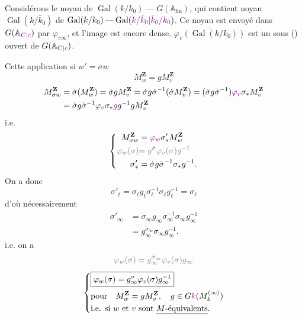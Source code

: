 Considérons le noyau de $\operatorname{Gal}(k/k_0)\mathbin{\text{---}}G(\mathbb A_{\mathrm{fin}})$, qui contient  noyau $\operatorname{Gal}(k/\bar k_0)$ de $\operatorname{Gal}(k/k_0)\mathbin{\text{---}}\operatorname{Gal}(\unsure{k/\bar k_0|\bar k_0/k_0})$. Ce noyau est envoyé dans $G(\mathbb A_{\unsure{C|c}})$ par $\varphi_{v\infty}$, et l'image est encore dense.     $\overline{\varphi_v(\operatorname{Gal}(k/k_0))}$ est un sous () ouvert de $G(\mathbb A_{\unsure{C|c}})$.

Cette application   si $w'=\sigma w$
\[
M_w^{\mathbf Z}=gM_v^{\mathbf Z}
\]
\[
\begin{aligned}
M_{\sigma w}^{\mathbf Z}&=\dot\sigma(M_w^{\mathbf Z})=\dot\sigma gM_v^{\mathbf Z}
=\dot\sigma g\dot\sigma^{-1}(\dot\sigma M_v^{\mathbf Z})
=(\dot\sigma g\dot\sigma^{-1})\deleted{\unsure{\varphi_v}}\sigma_*M_v^{\mathbf Z}\\
&=\dot\sigma g\dot\sigma^{-1}\deleted{\unsure{\varphi_v}}\sigma_*\deleted{\unsure{g}}g^{-1}gM_v^{\mathbf Z}
\end{aligned}
\]
i.e.
\[
\left\{\begin{aligned}
M_{\sigma w}^{\mathbf Z}&=\deleted{\unsure{\varphi_w}}\sigma'_*M_w^{\mathbf Z}\\
\deleted{\varphi_w(\sigma)}&\deleted{=g^{\dot\sigma}\varphi_v(\sigma)g^{-1}}\\
\sigma'_*&=\dot\sigma g\dot\sigma^{-1}\sigma_*g^{-1}.
\end{aligned}\right.
\]
On a donc 
\[
\sigma'_\ell=\sigma_\ell g_\ell\sigma_\ell^{-1}\sigma_\ell g_\ell^{-1}=\sigma_\ell
\]
d'où nécessairement
\[
\begin{aligned}
\sigma'_\infty&=\dot\sigma_\infty g_\infty\dot\sigma_\infty^{-1}\sigma_\infty g_\infty^{-1}\\
&=g_\infty^{\dot\sigma_\infty}\sigma_\infty g_\infty^{-1}.
\end{aligned}
\]
i.e. on a
\[
\deleted{\varphi_w(\sigma)=g_\infty^{\dot\sigma_\infty}\varphi_v(\sigma)g_\infty}
\]
\[
\left\{\begin{aligned}
&\boxed{\varphi_w(\sigma)=g_\infty^\sigma\varphi_v(\sigma)g_\infty^{-1}}\\
&\text{pour}\quad M_w^{\mathbf Z}=gM_v^{\mathbf Z},\quad g\in G\deleted{\unsure{k}}(M_k^{(\infty)})\\
&\text{i.e. si }w\text{ et }v\text{ sont }\uline{M\text{-équivalents}}.
\end{aligned}\right.
\]
